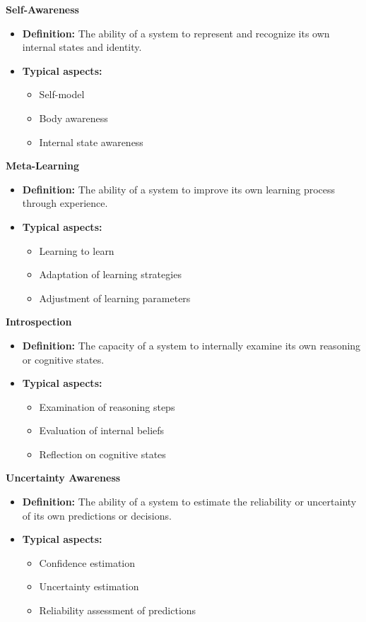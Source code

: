 \documentclass{book}
\providecommand{\ProjectDeepHeading}[2]{%
    \par\medskip\noindent\textbf{#2}\par\smallskip
}
\begin{document}
    
    \ProjectDeepHeading{3}{Self-Awareness}
    \begin{itemize}
        \item \textbf{Definition:} The ability of a system to represent and recognize its own internal states and identity.
        \item \textbf{Typical aspects:}
        \begin{itemize}
            \item Self-model
            \item Body awareness
            \item Internal state awareness
        \end{itemize}
    \end{itemize}
    
    
    \ProjectDeepHeading{3}{Meta-Learning}
    \begin{itemize}
        \item \textbf{Definition:} The ability of a system to improve its own learning process through experience.
        \item \textbf{Typical aspects:}
        \begin{itemize}
            \item Learning to learn
            \item Adaptation of learning strategies
            \item Adjustment of learning parameters
        \end{itemize}
    \end{itemize}
    
    
    \ProjectDeepHeading{3}{Introspection}
    \begin{itemize}
        \item \textbf{Definition:} The capacity of a system to internally examine its own reasoning or cognitive states.
        \item \textbf{Typical aspects:}
        \begin{itemize}
            \item Examination of reasoning steps
            \item Evaluation of internal beliefs
            \item Reflection on cognitive states
        \end{itemize}
    \end{itemize}
    
    
    \ProjectDeepHeading{3}{Uncertainty Awareness}
    \begin{itemize}
        \item \textbf{Definition:} The ability of a system to estimate the reliability or uncertainty of its own predictions or decisions.
        \item \textbf{Typical aspects:}
        \begin{itemize}
            \item Confidence estimation
            \item Uncertainty estimation
            \item Reliability assessment of predictions
        \end{itemize}
    \end{itemize}
    
\end{document}
